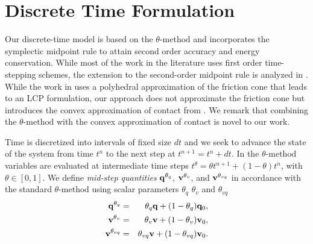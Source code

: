 \section{Discrete Time Formulation}
\label{sec:discrete_time_formulation}

Our discrete-time model is based on the $\theta\text{-method}$ \cite[\S
II.7]{bib:hairer2008solving} and incorporates the symplectic midpoint rule to
attain second order accuracy and energy conservation. While most of the work in
the literature uses first order time-stepping schemes, the extension to the
second-order midpoint rule is analyzed in \cite{bib:potra2006linearly}. While
the work in \cite{bib:potra2006linearly} uses a polyhedral approximation of the
friction cone that leads to an LCP formulation, our approach does not
approximate the friction cone but introduces the convex approximation of contact
from \cite{bib:anitescu2006} . We remark that combining the $\theta\text{-method}$ with the
convex approximation of contact is novel to our work. 

Time is discretized into intervals of fixed size $dt$ and we seek to advance the
state of the system from time $t^n$ to the next step at $t^{n+1} = t^n + dt$. In
the $\theta\text{-method}$ variables are evaluated at intermediate time steps
$t^\theta = \theta t^{n+1}+(1-\theta)t^{n}$, with $\theta \in [0, 1]$. We define
\emph{mid-step quantities} ${\mathbf{q}}^{\theta_{q}}$, ${\mathbf{v}}^{\theta_{v}}$, and
${\mathbf{v}}^{\theta_{vq}}$ in accordance with the standard $\theta\text{-method}$
using scalar parameters $\theta_q$ $\theta_v$ and $\theta_{vq}$
\begin{eqnarray}
	\mf{q}^{\theta_q} &=& \theta_q\mf{q} + (1-\theta_{q})\mf{q}_0,\nonumber\\
	\mf{v}^{\theta_v} &=& \theta_v\mf{v} + (1-\theta_v)\mf{v}_0,\nonumber\\
	\mf{v}^{\theta_{vq}} &=& \theta_{vq}\mf{v} + (1-\theta_{vq})\mf{v}_0.
	\label{eq:theta_method}
\end{eqnarray}

